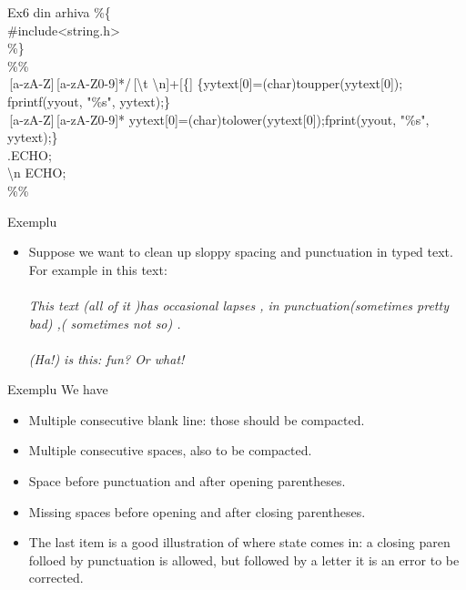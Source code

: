 \documentclass[pdf]{beamer}
\begin{document}
\begin{frame}{Ex6 din arhiva}
\%\{\\
\hspace{4mm} \#include<string.h>\\
\%\}\\
\%\%\\
\,[a-zA-Z]\,[a-zA-Z0-9]*/\,[\textbackslash t \textbackslash n]+[\{] \{yytext[0]=(char)toupper(yytext[0]); fprintf(yyout, "\%s", yytext);\}\\
\,[a-zA-Z]\,[a-zA-Z0-9]* yytext[0]=(char)tolower(yytext[0]);fprint(yyout, "\%s", yytext);\}\\
.ECHO;\\
\textbackslash n ECHO;\\
\%\%
\end{frame}



\begin{frame}{Exemplu}
\begin{itemize}
\item
Suppose we want to clean up sloppy spacing and punctuation in typed text. For example in this text: \\~\\

\textit{This \hspace{4mm} text \hspace{2mm} (all of it \hspace{3mm})has occasional lapses , in punctuation(sometimes pretty bad) ,( sometimes not so) . \\~\\
(Ha!) is this: fun? Or what!}
\end{itemize}
\end{frame}



\begin{frame}{Exemplu}
We have
\begin{itemize}
\item
\hspace{6mm} Multiple consecutive blank line: those should be compacted.
\item
\hspace{6mm} Multiple consecutive spaces, also to be compacted.
\item
\hspace{6mm} Space before punctuation and after opening parentheses.
\item
\hspace{6mm} Missing spaces before opening and after closing parentheses.
\item
The last item is a good illustration of where state comes in: a closing paren folloed by punctuation is allowed, but followed by a letter it is an error to be corrected.
\end{itemize}
\end{frame}
\end{document}

